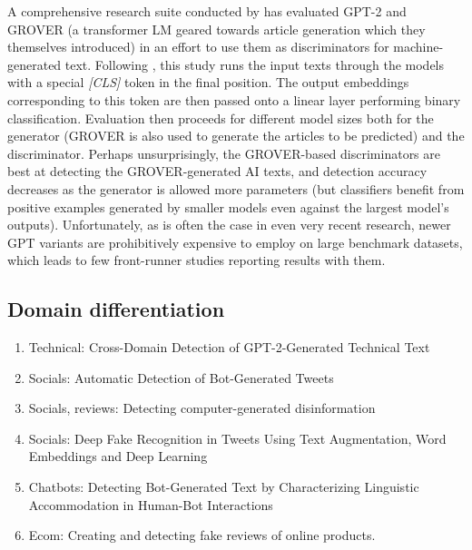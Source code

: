 A comprehensive research suite conducted by \citet{zellers2020defendingneuralfakenews} has evaluated GPT-2 and GROVER (a transformer LM geared towards article generation which they themselves introduced) in an effort to use them as discriminators for machine-generated text.
Following \citep{radford2018improving}, this study runs the input texts through the models with a special \emph{[CLS]} token in the final position.
The output embeddings corresponding to this token are then passed onto a linear layer performing binary classification.
Evaluation then proceeds for different model sizes both for the generator (GROVER is also used to generate the articles to be predicted) and the discriminator.
Perhaps unsurprisingly, the GROVER-based discriminators are best at detecting the GROVER-generated AI texts, and detection accuracy decreases as the generator is allowed more parameters (but classifiers benefit from positive examples generated by smaller models even against the largest model's outputs).
Unfortunately, as is often the case in even very recent research, newer GPT variants are prohibitively expensive \citep{galle2021unsupervised} to employ on large benchmark datasets, which leads to few front-runner studies reporting results with them.

\subsection{Domain differentiation}

\begin{enumerate}
    \item Technical: Cross-Domain Detection of GPT-2-Generated Technical Text
    \item Socials:  Automatic Detection of Bot-Generated Tweets
    \item Socials, reviews: Detecting computer-generated disinformation
    \item Socials: Deep Fake Recognition in Tweets Using Text Augmentation, Word Embeddings and Deep Learning
    \item Chatbots:  Detecting Bot-Generated Text by Characterizing Linguistic Accommodation in Human-Bot Interactions
    \item Ecom: Creating and detecting fake reviews of online products.
\end{enumerate}